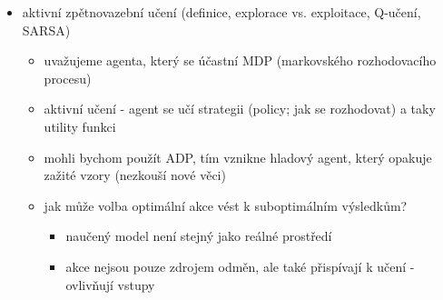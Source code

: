 \begin{itemize}
\begin{itemize}
\begin{itemize}
\item přechodový model odhaduje přímo z pozorovaných přechodů
\item utilitu počítá z Bellmanových rovnic třeba pomocí value iteration
\begin{itemize}
\item využíváme toho, že užitky nejsou nezávislé
\end{itemize}
\item ADP zajišťuje, že jsou odhady užitků konzistentní
\end{itemize}
\item temporal-difference (TD) learning
\begin{itemize}
\item upravuje stav, aby odpovídal aktuálně pozorovanému následníkovi
\item když dojde k přechodu ze stavu $s$ do stavu $s'$, tak na $U^\pi(s)$ použijeme update: $U^\pi(s)\leftarrow U^\pi(s)+\alpha\cdot (R(s)+\gamma\cdot U^\pi(s')-U^\pi(s))$
\begin{itemize}
\item $\alpha$ je learning rate
\end{itemize}
\item vlastnosti
\begin{itemize}
\item nepotřebuju přechodový model (je to model-free metoda)
\item konverguje to pomaleji než ADP
\end{itemize}
\end{itemize}
\end{itemize}
\item aktivní zpětnovazební učení (definice, explorace vs. exploitace, Q-učení, SARSA)
\begin{itemize}
\item uvažujeme agenta, který se účastní MDP (markovského rozhodovacího procesu)
\item aktivní učení - agent se učí strategii (policy; jak se rozhodovat) a taky utility funkci
\item mohli bychom použít ADP, tím vznikne hladový agent, který opakuje zažité vzory (nezkouší nové věci)
\item jak může volba optimální akce vést k suboptimálním výsledkům?
\begin{itemize}
\item naučený model není stejný jako reálné prostředí
\item akce nejsou pouze zdrojem odměn, ale také přispívají k učení - ovlivňují vstupy

\end{itemize}
\end{itemize}
\end{itemize}
